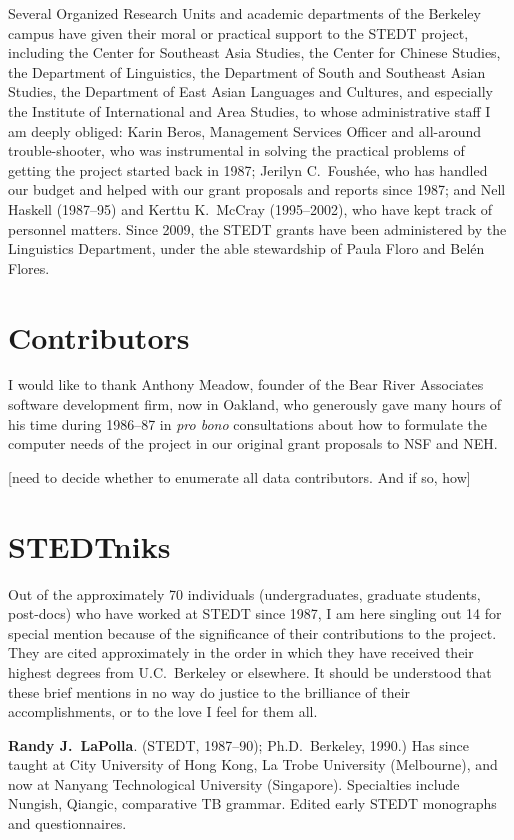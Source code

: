 Several Organized Research Units and academic departments of the Berkeley campus have given their moral or practical support to the STEDT project, including the Center for Southeast Asia Studies, the Center for Chinese Studies, the Department of Linguistics, the Department of South and Southeast Asian Studies, the Department of East Asian Languages and Cultures, and especially the Institute of International and Area Studies, to whose administrative staff I am deeply obliged: Karin Beros, Management Services Officer and all-around trouble-shooter, who was instrumental in solving the practical problems of getting the project started back in 1987; Jerilyn C.\ Foush\'ee, who has handled our budget and helped with our grant proposals and reports since 1987; and Nell Haskell (1987–95) and Kerttu K.\ McCray (1995–2002), who have kept track of personnel matters.  Since 2009, the STEDT grants have been administered by the Linguistics Department, under the able stewardship of Paula Floro and Bel\'en Flores.

\section{Contributors}

I would like to thank Anthony Meadow, founder of the Bear River Associates software development firm, now in Oakland, who generously gave many hours of his time during 1986–87 in {\it pro bono} consultations about how to formulate the computer needs of the project in our original grant proposals to NSF and NEH.

[need to decide whether to enumerate all data contributors. And if so, how]

\section{STEDTniks}

Out of the approximately 70 individuals (undergraduates, graduate students, post-docs) who have worked at STEDT since 1987, I am here singling out 14 for special mention because of the significance of their contributions to the project. They are cited approximately in the order in which they have received their highest degrees from U.C.\ Berkeley or elsewhere. It should be understood that these brief mentions in no way do justice to the brilliance of their accomplishments, or to the love I feel for them all.

\textbf{Randy J.\ LaPolla}. (STEDT, 1987–90); Ph.D.\ Berkeley, 1990.) Has since taught at City University of Hong Kong, La Trobe University (Melbourne), and now at Nanyang Technological University (Singapore). Specialties include Nungish, Qiangic, comparative TB grammar. Edited early STEDT monographs and questionnaires.

